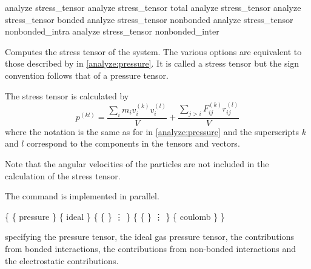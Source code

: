\begin{essyntax}
   analyze stress_tensor
   analyze stress_tensor total
   analyze stress_tensor 
   analyze stress_tensor bonded 
   analyze stress_tensor nonbonded  
   analyze stress_tensor nonbonded_intra 
   analyze stress_tensor nonbonded_inter 
\end{essyntax}

Computes the stress tensor of the system.  The various options are equivalent to those described by
 in \vref{analyze:pressure}. It is called a stress tensor but the sign
convention follows that of a pressure tensor.


The stress tensor is calculated by 
\begin{equation}
  p^{(kl)} = \frac{\sum_{i} {m_{i}v_{i}^{(k)}v_{i}^{(l)}}}{V} + \frac{\sum_{j>i}{F_{ij}^{(k)}r_{ij}^{(l)}}}{V}
\end{equation}
where the notation is the same as for  in \vref{analyze:pressure} and the
superscripts $k$ and $l$ correspond to the components in the tensors and vectors.  

Note that the
angular velocities of the particles are not included in the calculation of the stress tensor. 


The command is implemented in parallel.


\begin{code}
\{ \{ pressure  \}
   \{ ideal  \} 
   \{ \{   \}
      \vdots
   \}
   \{ \{   \}
      \vdots
   \}
   \{ coulomb  \}
\}
\end{code}
specifying the pressure tensor, the ideal gas pressure tensor, the
contributions from bonded interactions, the contributions from
non-bonded interactions and the electrostatic contributions.

